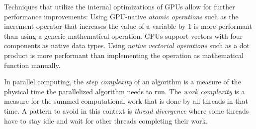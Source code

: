 Techniques that utilize the internal optimizations of GPUs allow for
further performance improvements: Using GPU-native
\textit{atomic operations} such as the increment operator that increases
the value of a variable by 1 is more performant than using a generic
mathematical operation. GPUs support vectors with four components as
native data types. Using \textit{native vectorial operations} such as a
dot product is more performant than implementing the operation as
mathematical function manually. \cite{cudacourse}

In parallel computing, the \textit{step complexity} of an algorithm is a
measure of the physical time the parallelized algorithm needs to run.
The \textit{work complexity} is a measure for the summed computational
work that is done by all threads in that time. A pattern to avoid in
this context is \textit{thread divergence} where some threads have to
stay idle and wait for other threads completing their work.
\cite{cudacourse}
